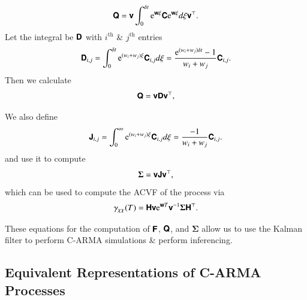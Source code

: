 \documentclass[a4paper,fleqn,usenatbib]{mnras}
\begin{document}
\begin{equation}\label{eq:DistMat3}
\textbf{\textsf{Q}} = \textbf{\textsf{v}} \int_{0}^{\delta t} \mathrm{e}^{\textbf{\textsf{w}}\xi}\textbf{\textsf{C}}\mathrm{e}^{\textbf{\textsf{w}}\xi} d\xi \textbf{\textsf{v}}^{\top}.
\end{equation}
Let the integral be $\textbf{\textsf{D}}$ with $i^{\mathrm{th}}$ \& $j^{\mathrm{th}}$ entries
\begin{equation}\label{eq:DistMat4}
\textbf{\textsf{D}}_{i,j} = \int_{0}^{\delta t} \mathrm{e}^{(w_{i} + w_{j})\xi} \textbf{\textsf{C}}_{i,j} d\xi = \frac{\mathrm{e}^{(w_{i} + w_{j})\delta t} - 1}{w_{i} + w_{j}}\textbf{\textsf{C}}_{i,j} .
\end{equation}
Then we calculate
\begin{equation}\label{eq:DistMat5}
\textbf{\textsf{Q}} = \textbf{\textsf{v}}\textbf{\textsf{D}}\textbf{\textsf{v}}^{\top},
\end{equation}

We also define 
\begin{equation}\label{eq:DistMat6}
\textbf{\textsf{J}}_{i,j} = \int_{0}^{\infty} \mathrm{e}^{(w_{i} + w_{j})\xi} \textbf{\textsf{C}}_{i,j} d\xi = \frac{ - 1}{w_{i} + w_{j}}\textbf{\textsf{C}}_{i,j}.
\end{equation}
and use it to compute
\begin{equation}\label{eq:Sigma}
\boldsymbol{\Sigma} = \textbf{\textsf{v}}\textbf{\textsf{J}}\textbf{\textsf{v}}^{\top},
\end{equation}
which can be used to compute the ACVF of the process via \citep{DimensionEstimationBrockwell}
\begin{equation}\label{eq:ACVFStateSpace}
\gamma_{\chi\chi}(T) = \textbf{\textsf{H}} \textbf{\textsf{v}}\mathrm{e}^{\textbf{\textsf{w}}T}\textbf{\textsf{v}}^{-1} \boldsymbol{\Sigma}\textbf{\textsf{H}}^{\top}.
\end{equation}

These equations for the computation of $\textbf{\textsf{F}}$, $\textbf{\textsf{Q}}$, and $\boldsymbol{\Sigma}$ allow us to use the Kalman filter to perform C-ARMA simulations \& perform inferencing.

\subsection[Representations]{Equivalent Representations of C-ARMA Processes}
\end{document}

